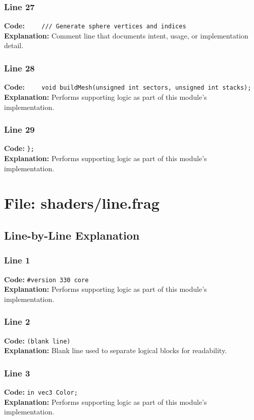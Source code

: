 \documentclass[11pt,a4paper]{article}
\begin{document}
\subsubsection*{Line 27}
\textbf{Code:} \verb|    /// Generate sphere vertices and indices|\\
\textbf{Explanation:} Comment line that documents intent, usage, or implementation detail.

\subsubsection*{Line 28}
\textbf{Code:} \verb|    void buildMesh(unsigned int sectors, unsigned int stacks);|\\
\textbf{Explanation:} Performs supporting logic as part of this module's implementation.

\subsubsection*{Line 29}
\textbf{Code:} \verb|};|\\
\textbf{Explanation:} Performs supporting logic as part of this module's implementation.

\newpage
\section{File: shaders/line.frag}
\subsection{Line-by-Line Explanation}
\subsubsection*{Line 1}
\textbf{Code:} \verb|#version 330 core|\\
\textbf{Explanation:} Performs supporting logic as part of this module's implementation.

\subsubsection*{Line 2}
\textbf{Code:} \texttt{(blank line)}\\
\textbf{Explanation:} Blank line used to separate logical blocks for readability.

\subsubsection*{Line 3}
\textbf{Code:} \verb|in vec3 Color;|\\
\textbf{Explanation:} Performs supporting logic as part of this module's implementation.
\end{document}
